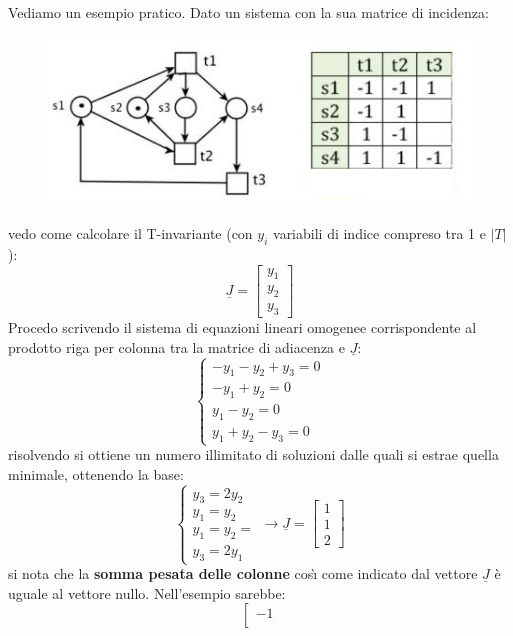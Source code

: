 \documentclass[a4paper,12pt, oneside]{book}
\begin{document}
\begin{esempio}
  Vediamo un esempio pratico. Dato un sistema con la sua matrice di incidenza:
  \begin{figure}[H]
    \centering
    \includegraphics[scale = 2.2]{img/ti2.jpg}
  \end{figure}
  vedo come calcolare il T-invariante (con $y_i$ variabili di indice compreso
  tra 1 e $|T|$):
  \[\underline{J}=\left[
      \begin{matrix}
        y_1\\
        y_2\\
        y_3
      \end{matrix}
    \right]\]
  Procedo scrivendo il sistema di equazioni lineari omogenee corrispondente al
  prodotto riga per colonna tra la matrice di adiacenza e $\underline{J}$:
  \[
    \begin{cases}
      -y_1-y_2+y_3=0\\
      -y_1+y_2=0\\
      y_1-y_2=0\\
      y_1+y_2-y_3=0
    \end{cases}
  \]
  risolvendo si ottiene un numero illimitato di soluzioni dalle quali si
  estrae quella minimale, ottenendo la base:
  \[
    \begin{cases}
      y_3=2y_2\\
      y_1=y_2\\
      y_1=y_2=\\
      y_3=2y_1
    \end{cases}\to\underline{J}=\left[
      \begin{matrix}
        1\\
        1\\
        2
      \end{matrix}
    \right]
  \]
  si nota che la \textbf{somma pesata delle colonne} cosı̀ come indicato dal
  vettore $\underline{J}$ è uguale al vettore nullo. Nell'esempio sarebbe:
  \[
    \left[
      \begin{matrix}
        -1\\

\end{matrix}\]
\end{esempio}
\end{document}
